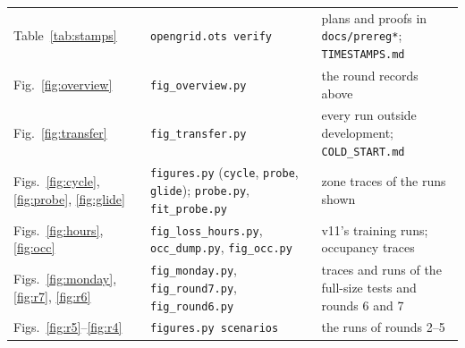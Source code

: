 \documentclass{article}
\begin{document}
\begin{table}[!htb]
\begin{tabular}{>{\raggedright\arraybackslash}p{2.2cm}>{\raggedright\arraybackslash}p{4.2cm}>{\raggedright\arraybackslash}p{6.2cm}}
Table~\ref{tab:stamps} & \texttt{opengrid.ots verify} & plans and proofs in \texttt{docs/prereg*}; \texttt{TIMESTAMPS.md}\\
Fig.~\ref{fig:overview} & \texttt{fig\_overview.py} & the round records above\\
Fig.~\ref{fig:transfer} & \texttt{fig\_transfer.py} & every run outside development; \texttt{COLD\_START.md}\\
Figs.~\ref{fig:cycle}, \ref{fig:probe}, \ref{fig:glide} & \texttt{figures.py} (\texttt{cycle}, \texttt{probe}, \texttt{glide}); \texttt{probe.py}, \texttt{fit\_probe.py} & zone traces of the runs shown\\
Figs.~\ref{fig:hours}, \ref{fig:occ} & \texttt{fig\_loss\_hours.py}, \texttt{occ\_dump.py}, \texttt{fig\_occ.py} & v11's training runs; occupancy traces\\
Figs.~\ref{fig:monday}, \ref{fig:r7}, \ref{fig:r6} & \texttt{fig\_monday.py}, \texttt{fig\_round7.py}, \texttt{fig\_round6.py} & traces and runs of the full-size tests and rounds 6 and 7\\
Figs.~\ref{fig:r5}--\ref{fig:r4} & \texttt{figures.py scenarios} & the runs of rounds 2--5\\\bottomrule
\end{tabular}
\end{table}


\end{document}
